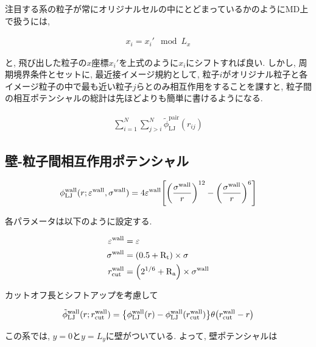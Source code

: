 注目する系の粒子が常にオリジナルセルの中にとどまっているかのようにMD上で扱うには,

\begin{align}
  x_{i} = x_{i}' \mod L_{x} 
\end{align}

と,  飛び出した粒子の$x$座標$x_{i}'$を上式のように$x_i$にシフトすれば良い. しかし, 周期境界条件とセットに, 最近接イメージ規約として, 粒子$i$がオリジナル粒子と各イメージ粒子の中で最も近い粒子$j$らとのみ相互作用をすることを課すと, 粒子間の相互ポテンシャルの総計は先ほどよりも簡単に書けるようになる.

\begin{align}
  \sum_{i=1}^{N} \sum_{j > i}^{N} \tilde{\phi}_{\text{LJ}}^{\text{pair}} (r_{ij})
\end{align}


\subsection{壁-粒子間相互作用ポテンシャル}

\begin{align}
  \phi_{\text{LJ}}^{\text{wall}}(r; \varepsilon^{\text{wall}}, \sigma^{\text{wall}}) = 4\varepsilon^{\text{wall}} \qty[\qty(\frac{\sigma^{\text{wall}}}{r})^{12} - \qty(\frac{\sigma^{\text{wall}}}{r})^{6} ] \\
\end{align}

各パラメータは以下のように設定する.

\begin{align}
  \varepsilon^{\text{wall}} &= \varepsilon \\
  \sigma^{\text{wall}} &= \qty(0.5 + \text{R}_\text{t}) \times \sigma \\
  r^{\text{wall}}_{\text{cut}} &= \qty(2^{1/6} + \text{R}_\text{a}) \times \sigma^{\text{wall}}
\end{align}

カットオフ長とシフトアップを考慮して

\begin{align}
  \tilde{\phi}_{\text{LJ}}^{\text{wall}}(r;r_{\text{cut}}^{\text{wall}}) = \qty{\phi_{\text{LJ}}^{\text{wall}}(r) - \phi_{\text{LJ}}^{\text{wall}}(r_{\text{cut}}^{\text{wall}})}\theta \qty(r_{\text{cut}}^{\text{wall}}-r) \\
\end{align}

この系では, $y=0$と$y=L_y$に壁がついている. よって, 壁ポテンシャルは

